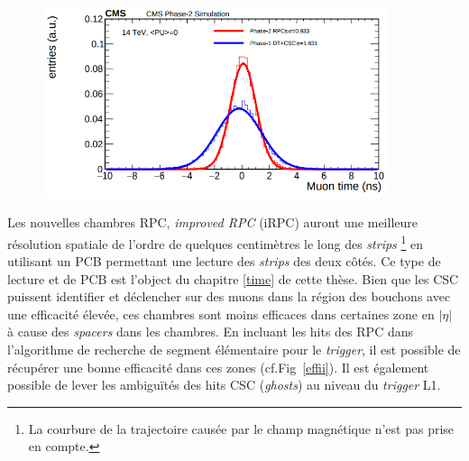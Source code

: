 \begin{itemize}[label=$\bullet$]
	\begin{figure}[ht!]
		\centering
		\includegraphics[width=0.90\textwidth]{RPC/intrasec.png}
		\label{intrasec}
	\end{figure}
	Les nouvelles chambres RPC, \textit{improved RPC} (iRPC) auront une meilleure résolution spatiale de l'ordre de quelques centimètres le long des \textit{strips} \footnote{La courbure de la trajectoire causée par le champ magnétique n'est pas prise en compte.} en utilisant un PCB permettant une lecture des \textit{strips} des deux côtés. Ce type de lecture et de PCB est l'object du chapitre \ref{time} de cette thèse.
	\newpage
	Bien que les CSC puissent identifier et déclencher sur des muons dans la région des bouchons avec une efficacité élevée, ces chambres sont moins efficaces dans certaines zone en $|\eta|$ à cause des \textit{spacers} dans les chambres. En incluant les hits des RPC dans l'algorithme de recherche de segment élémentaire pour le \textit{trigger}, il est possible de récupérer une bonne efficacité dans ces zones (cf.Fig~\ref{effii}). Il est également possible de lever les ambiguïtés des hits CSC (\textit{ghosts})  au niveau du \textit{trigger} L1.
	

\end{itemize}
